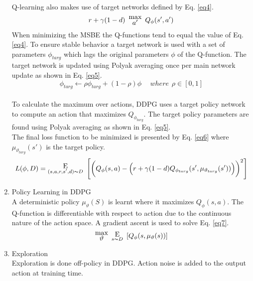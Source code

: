 \begin{enumerate}[label={\alph*)}]
    Q-learning also makes use of target networks defined by Eq. \ref{eq4}.
    \begin{equation}
    r + \gamma (1 - d) \hspace{5pt} \substack{\mathlarger{\text{max}} \\ \mathlarger{a'}}\hspace{5pt} Q_{\phi}(s',a')
        \label{eq4}
    \end{equation}
    When minimizing the MSBE the Q-functions tend to equal the value of Eq. \ref{eq4}. To ensure stable behavior a target network is used with a set of parameters $\phi_{targ}$  which lags the original parameters $\phi$ of the Q-function. The target network is updated using Polyak averaging once per main network update as shown in Eq. \ref{eq5}.\\
    \begin{equation}
    \phi_{targ} \leftarrow \rho \phi_{targ} + (1 - \rho)\phi \hspace{15pt} where \hspace{5pt}\rho \in [0,1]
        \label{eq5}
    \end{equation}\\
    To calculate the maximum over actions, DDPG uses a target policy network to compute an action that maximizes $Q_{\phi_{targ}}$. The target policy parameters are found using Polyak averaging as shown in Eq. \ref{eq5}.\\

    The final loss function to be minimized is presented by Eq. \ref{eq6} where $\mu_{\vartheta_{targ}}(s')$ is the target policy.\\
    \begin{equation}
    L(\phi, D) = \substack{ \mathlarger{\mathlarger{\text{E}}}  \\ (s,a,r,s',d) \thicksim D}\hspace{5pt} \Bigg[\bigg(Q_{\phi}(s, a) - \Big(r + \gamma (1-d)  Q_{\phi_{targ}}(s',\mu_{\vartheta_{targ}}(s'))\Big)\bigg)^2\Bigg]  
        \label{eq6}
    \end{equation}
    \item Policy Learning in DDPG\\
    A deterministic policy $\mu_{\vartheta}(S)$ is learnt where it maximizes $Q_{\phi}(s,a)$. The Q-function is differentiable with respect to action due to the continuous nature of the action space. A gradient ascent is used to solve Eq. \ref{eq7}.
    \begin{equation}
    \substack{\mathlarger{\text{max}} \\ \mathlarger{\vartheta}} \hspace{5pt} \substack{\mathlarger{\text{E}} \\ s \thicksim D} \hspace{5pt} [Q_{\phi}(s, \mu_{\vartheta}(s))]  
        \label{eq7}
    \end{equation}\clearpage
    \item Exploration\\
    Exploration is done off-policy in DDPG. Action noise is added to the output action at training time.
    \end{enumerate}
